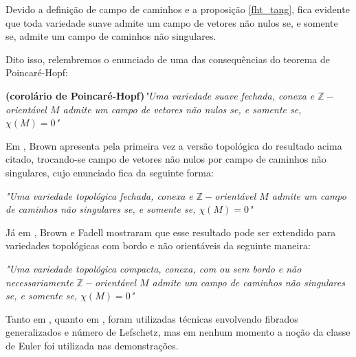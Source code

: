 \documentclass[12pt,oneside]{book} %
\newcommand{\Z}{\mathbb{Z}}
\begin{document}
\par Devido a definição de campo de caminhos e a proposição \ref{fht_tang}, fica evidente que toda variedade suave admite um campo de vetores não nulos se, e somente se, admite um campo de caminhos não singulares.

\par Dito isso, relembremos o enunciado de uma das consequências do teorema de Poincaré-Hopf:

\begin{center}
	\begin{minipage}{10cm}
		\textbf{(corolário de Poincaré-Hopf)}\textit{"Uma variedade suave fechada, conexa e $\Z-$orientável $M$ admite um campo de vetores não nulos se, e somente se, $\chi(M)=0$"}
	\end{minipage}
\end{center}

\par Em \cite{brown}, Brown apresenta pela primeira vez a versão topológica do resultado acima citado, trocando-se campo de vetores não nulos por campo de caminhos não singulares, cujo enunciado fica da seguinte forma:

\begin{center}
	\begin{minipage}{10cm}
		\textit{"Uma variedade topológica fechada, conexa e $\Z-$orientável $M$ admite um campo de caminhos não singulares se, e somente se, $\chi(M)=0$"}
	\end{minipage}
\end{center}

\par Já em \cite{brown_2}, Brown e Fadell mostraram que esse resultado pode ser extendido para variedades topológicas com bordo e não orientáveis da seguinte maneira:

\begin{center}
	\begin{minipage}{10cm}
		\textit{"Uma variedade topológica compacta, conexa, com ou sem bordo e não necessariamente $\Z-$orientável $M$ admite um campo de caminhos não singulares se, e somente se, $\chi(M)=0$"}
	\end{minipage}
\end{center}

\par  Tanto em \cite{brown}, quanto em \cite{brown_2}, foram utilizadas técnicas envolvendo fibrados generalizados e número de Lefschetz, mas em nenhum momento a noção da classe de Euler foi utilizada nas demonstrações.
\end{document}
